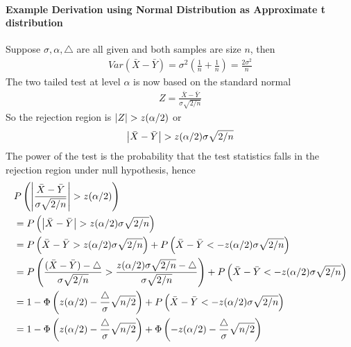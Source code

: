\paragraph{Example Derivation using Normal Distribution as Approximate t distribution} 
Suppose $\sigma, \alpha, \triangle$ are all given and both samples are size $n$, then 
    \begin{align*}
        Var(\bar{X} - \bar{Y}) = \sigma^2 (\frac{1}{n} + \frac{1}{n}) = \frac{2\sigma^2}{n}
    \end{align*}
The two tailed test at level $\alpha$ is now based on the standard normal 
    \begin{align*}
        Z = \frac{\bar{X} -\bar{Y}}{\sigma \sqrt{2/n}}
    \end{align*}
So the rejection region is $\left| Z \right| > z(\alpha/2)$ or 
    \begin{align*}
        \left| \bar{X} - \bar{Y} \right| > z(\alpha/2) \sigma \sqrt{2/n}
    \end{align*}
The power of the test is the probability that the test statistics falls in the rejection region under null hypothesis, hence 
    \begin{align*}
        & P\left(\left| \frac{\bar{X} -\bar{Y}}{\sigma \sqrt{2/n}} \right| > z(\alpha/2) \right)\\
        & = P\left(  \left| \bar{X} - \bar{Y} \right| > z(\alpha/2) \sigma \sqrt{2/n} \right) \\
        & = P\left(\bar{X} - \bar{Y} >  z(\alpha/2) \sigma \sqrt{2/n} \right) + P\left( \bar{X} - \bar{Y} <  -z(\alpha/2) \sigma \sqrt{2/n} \right) \\
        & = P\left(\frac{(\bar{X} - \bar{Y})-\triangle}{\sigma \sqrt{2/n}} >  \frac{z(\alpha/2) \sigma \sqrt{2/n}-\triangle}{\sigma\sqrt{2/n}} \right) + P\left( \bar{X} - \bar{Y} <  -z(\alpha/2) \sigma \sqrt{2/n} \right)\\
        & = 1 - \Phi\left( z(\alpha/2) - \frac{\triangle}{\sigma}\sqrt{n/2}\right) +  P\left( \bar{X} - \bar{Y} <  -z(\alpha/2) \sigma \sqrt{2/n} \right)\\
        & =  1 - \Phi\left( z(\alpha/2) - \frac{\triangle}{\sigma}\sqrt{n/2}\right) + \Phi\left( -z(\alpha/2) - \frac{\triangle}{\sigma}\sqrt{n/2}\right)
    \end{align*}